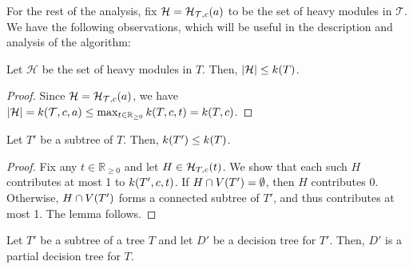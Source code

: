 For the rest of the analysis, fix $\mathcal{H}=\mathcal{H}_{\mathcal{T},c}\mathopen{}\left( a \right)$ to be the set of heavy modules in $\mathcal{T}$. We have the following observations, which will be useful in the description and analysis of the algorithm:

\begin{observation}\label{heavymodulesetsize}
Let $\mathcal{H}$ be the set of heavy modules in $T$. Then, $\mathopen{}\left| \mathcal{H} \right|\leq k\mathopen{}\left( T \right)$.
\begin{proof}
    Since $\mathcal{H}=\mathcal{H}_{\mathcal{T},c}\mathopen{}\left( a \right)$, we have $\mathopen{}\left| \mathcal{H} \right|=k\mathopen{}\left( \mathcal{T}, c, a \right)\leq \max_{t\in \mathbb{R}_{\geq 0}}k\mathopen{}\left( T, c, t \right) = k\mathopen{}\left( T, c \right)$.
\end{proof}
\end{observation}

\begin{observation}\label{subtreeKUpModularity}
    Let $T'$ be a subtree of $T$. Then, $k\mathopen{}\left( T' \right)\leq k\mathopen{}\left( T \right)$.
    \begin{proof}
        Fix any $t\in \mathbb{R}_{\geq 0}$ and let $H\in \mathcal{H}_{T, c}\mathopen{}\left( t \right)$. We show that each such $H$ contributes at most 1 to $k\mathopen{}\left( T', c, t \right)$. If $H\cap V\mathopen{}\left( T' \right) = \emptyset$, then $H$ contributes 0. Otherwise, $H\cap V\mathopen{}\left( T' \right)$ forms a connected subtree of $T'$, and thus contributes at most 1. The lemma follows.
    \end{proof}
\end{observation}

\begin{observation}\label{subtreePartialDt}
    Let $T'$ be a subtree of a tree $T$ and let $D'$ be a decision tree for $T'$. Then, $D'$ is a partial decision tree for $T$.
\end{observation}

